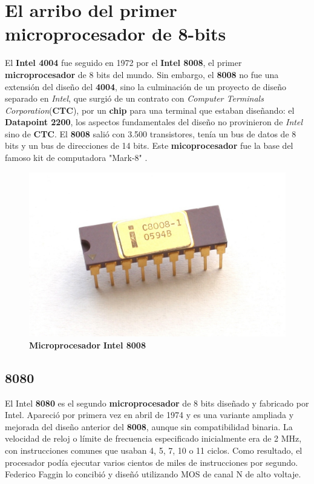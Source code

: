 \section{El arribo del primer microprocesador de 8-bits}
El \textbf{Intel 4004} fue seguido en 1972 por el \textbf{Intel 8008}, el primer \textbf{microprocesador} de 8 bits del mundo.
Sin embargo, el \textbf{8008} no fue una extensión del diseño del \textbf{4004}, sino la culminación de un proyecto de diseño separado
en \emph{Intel}, que surgió de un contrato con \emph{Computer Terminals Corporation}(\textbf{CTC}), por un \textbf{chip} para
una terminal que estaban diseñando: el \textbf{Datapoint 2200}, los aspectos fundamentales del diseño no provinieron de \emph{Intel}
sino de \textbf{CTC}. El \textbf{8008} salió con 3.500 transistores, tenía un bus de datos de 8 bits y un bus de direcciones de 14 bits. Este
\textbf{micoprocesador} fue la base del famoso kit de computadora "Mark-8" .

\begin{figure}[htb]
	\centering
	\includegraphics[scale = 0.15]{Graphics/Intel_C8008-1.jpg}
	\caption{\textbf{Microprocesador}  \textbf{Intel 8008}}
	\label{fig:13}
\end{figure}

\subsection{8080}
El Intel \textbf{8080} es el segundo \textbf{microprocesador} de 8 bits diseñado y fabricado por Intel. Apareció por primera vez en abril de 1974 y es una variante ampliada y mejorada
del diseño anterior del \textbf{8008}, aunque sin compatibilidad binaria. La velocidad de reloj o límite de frecuencia especificado inicialmente era de 2 MHz, con instrucciones
comunes que usaban 4, 5, 7, 10 o 11 ciclos. Como resultado, el procesador podía ejecutar varios cientos de miles de instrucciones por segundo. Federico Faggin lo concibió 
y diseñó utilizando MOS de canal N de alto voltaje.

